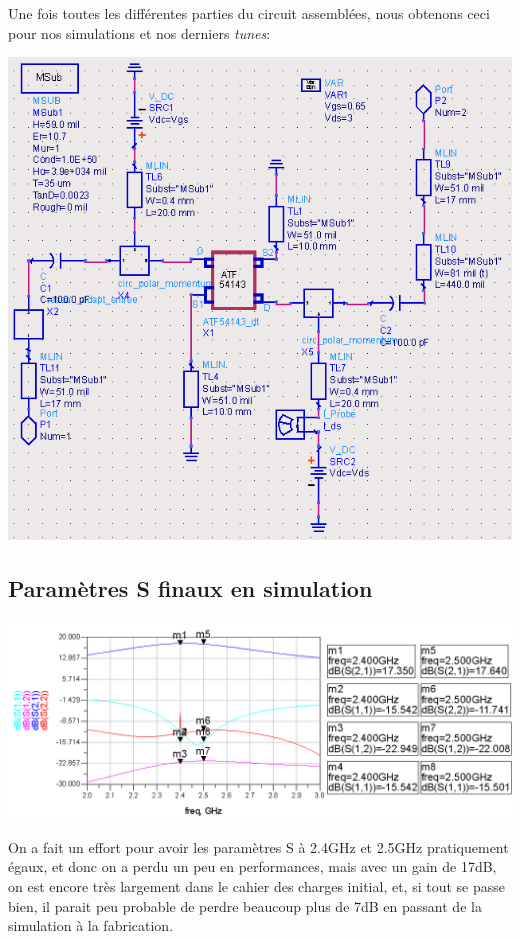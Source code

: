 \documentclass[12pt]{article}
\begin{document}
Une fois toutes les différentes parties du circuit assemblées, nous obtenons ceci pour nos simulations et nos derniers \textit{tunes}:

\begin{center}
\includegraphics[width=\linewidth]{img/simu_final}
\end{center}

\subsection{Paramètres S finaux en simulation}

\begin{center}
\includegraphics[width=\linewidth]{img/param_S_simu}
\end{center}

On a fait un effort pour avoir les paramètres S à 2.4GHz et 2.5GHz pratiquement égaux, et donc on a perdu un peu en performances, mais avec un gain de 17dB, on est encore très largement dans le cahier des charges initial, et, si tout se passe bien, il parait peu probable de perdre beaucoup plus de 7dB en passant de la simulation à la fabrication.
\end{document}

